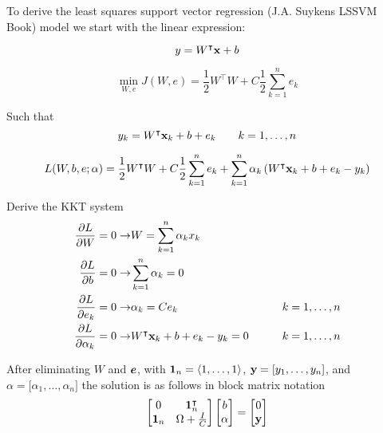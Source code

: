 To derive the least squares support vector regression (J.A. Suykens LSSVM Book) model we start with the linear expression:

\begin{equation}
  y=W^{\intercal}\vb{x}+b
\end{equation}

\begin{equation}
  \min_{W,e} J(W,e) = \frac{1}{2}W^{\intercal}W + C\frac{1}{2}\sum_{k=1}^{n}e_{k}
\end{equation}

Such that
\begin{equation}
  y_{k}=W^{\intercal}\vb{x}_{k}+b+e_{k} \qquad k=1,\dots,n
\end{equation}

\begin{equation}
  L(W,b,e;\vb{\alpha}) = \frac{1}{2}W^{\intercal}W + C\frac{1}{2}\sum_{k=1}^{n}e_{k} + \sum_{k=1}^{n}\alpha_{k} \left(W^{\intercal}\vb{x}_{k}+b+e_{k} - y_{k} \right)
\end{equation}

Derive the KKT system
\begin{equation}
  \begin{split}
    \pdv{L}{W} = 0 \rightarrow & W = \sum_{k=1}^{n}\alpha_{k}x_{k} \\
    \pdv{L}{b} = 0 \rightarrow & \sum_{k=1}^{n}\alpha_{k} = 0 \\
    \pdv{L}{e_{k}} = 0 \rightarrow & \alpha_{k} = C e_{k} & \qquad k=1,\dots,n\\
    \pdv{L}{\alpha_{k}} = 0 \rightarrow & W^{\intercal}\vb{x}_{k}+b+e_{k} - y_{k} = 0 & \qquad k=1,\dots,n\\
  \end{split}
\end{equation}

After eliminating $W$ and $\vb*{e}$, with $\vb{1}_{n} = \langle 1,\dots,1\rangle$, $\vb{y} = \lbrack y_1, \dots, y_n \rbrack $, and ${\alpha} = \lbrack \alpha_1, \dots, \alpha_n \rbrack $ the solution is as follows in block matrix notation
\begin{equation} \label{eq:lssvrSolution}
  \begin{bmatrix}
    0          & \vb{1}_{n}^{\intercal} \\
    \vb{1}_{n} & \Omega + \frac{I}{C}
  \end{bmatrix}
  \begin{bmatrix}
    b           \\
    \vb{\alpha} \\
  \end{bmatrix}
  =
  \begin{bmatrix}
    0      \\
    \vb{y} \\
  \end{bmatrix}
\end{equation}

